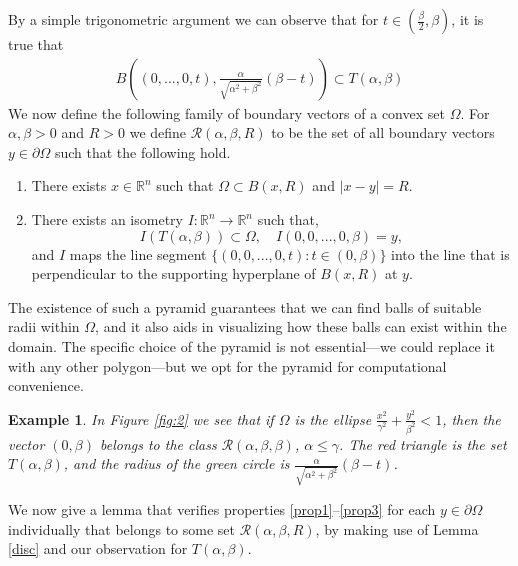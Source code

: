 \documentclass[footinclude=true]{amsart}
\theoremstyle{plain}
\newtheorem*{example*}{Example}
\begin{document}
	By a simple trigonometric argument we can observe that for $t\in (\frac{\beta}{2},\beta)$, it is true that 
	\begin{eqnarray}\label{6}
		B((0,...,0,t),\frac{\alpha}{\sqrt{\alpha^{2}+\beta^{2}}}(\beta-t))\subset T(\alpha,\beta)
	\end{eqnarray} 
	We now define the following family of boundary vectors of a convex set $\Omega$. For $\alpha,\beta>0$ and $R>0$ we define $\mathscr{R}(\alpha,\beta,R)$ to be the set of all boundary vectors $y\in\partial\Omega$ such that the following hold.
	\begin{enumerate}
		\item There exists $x\in\mathbb{R}^{n}$ such that $\Omega\subset B(x,R)$ and $|x-y|=R$.
		\item There exists an isometry $I:\mathbb{R}^{n}\to\mathbb{R}^{n}$ such that, $$I(T(\alpha,\beta))\subset \Omega, \quad I(0,0,...,0,\beta)=y,$$ and $I$ maps the line segment $\{(0,0,...,0,t):t\in (0,\beta)\}$ into the line that is perpendicular to the supporting hyperplane of $B(x,R)$ at $y$.
	\end{enumerate}
	The existence of such a pyramid guarantees that we can find balls of suitable radii within 
	$\Omega$, and it also aids in visualizing how these balls can exist within the domain. The specific choice of the pyramid is not essential—we could replace it with any other polygon—but we opt for the pyramid for computational convenience.
	\begin{example*}
		In Figure \ref{fig:2} we see that if $\Omega$ is the ellipse $\frac{x^2}{\gamma^2}+\frac{y^2}{\beta^2}<1$, then the vector $(0,\beta)$ belongs to the class $\mathscr{R}(\alpha,\beta,\beta)$, $\alpha\leq \gamma$. The red triangle is the set $T(\alpha,\beta)$, and the radius of the green circle is $\frac{\alpha}{\sqrt{\alpha^2+\beta^2}}(\beta-t)$.
	\end{example*}
 We now give a lemma that verifies properties \eqref{prop1}--\eqref{prop3} for each $y\in\partial\Omega$ individually that belongs to some set $\mathscr{R}(\alpha,\beta,R)$, by making use of Lemma \ref{disc} and our observation for $T(\alpha,\beta)$.
\end{document}
